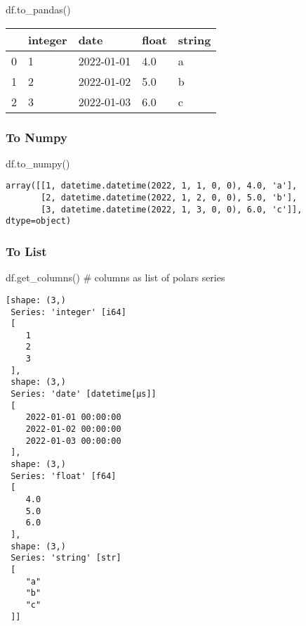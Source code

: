 \documentclass[
  letterpaper,
  DIV=11,
  numbers=noendperiod]{scrartcl}
\newenvironment{Shaded}{\begin{snugshade}}{\end{snugshade}}
\newcommand{\CommentTok}[1]{\textcolor[rgb]{0.37,0.37,0.37}{#1}}
\newcommand{\NormalTok}[1]{\textcolor[rgb]{0.00,0.23,0.31}{#1}}
\begin{document}
\begin{Shaded}
\begin{Highlighting}[]
\NormalTok{df.to\_pandas()}
\end{Highlighting}
\end{Shaded}

\begin{longtable}[]{@{}lllll@{}}
\toprule()
& integer & date & float & string \\
\midrule()
\endhead
0 & 1 & 2022-01-01 & 4.0 & a \\
1 & 2 & 2022-01-02 & 5.0 & b \\
2 & 3 & 2022-01-03 & 6.0 & c \\
\bottomrule()
\end{longtable}

\hypertarget{to-numpy}{%
\subsubsection{To Numpy}\label{to-numpy}}

\begin{Shaded}
\begin{Highlighting}[]
\NormalTok{df.to\_numpy()}
\end{Highlighting}
\end{Shaded}

\begin{verbatim}
array([[1, datetime.datetime(2022, 1, 1, 0, 0), 4.0, 'a'],
       [2, datetime.datetime(2022, 1, 2, 0, 0), 5.0, 'b'],
       [3, datetime.datetime(2022, 1, 3, 0, 0), 6.0, 'c']], dtype=object)
\end{verbatim}

\hypertarget{to-list}{%
\subsubsection{To List}\label{to-list}}

\begin{Shaded}
\begin{Highlighting}[]
\NormalTok{df.get\_columns() }\CommentTok{\# columns as list of polars series}
\end{Highlighting}
\end{Shaded}

\begin{verbatim}
[shape: (3,)
 Series: 'integer' [i64]
 [
    1
    2
    3
 ],
 shape: (3,)
 Series: 'date' [datetime[μs]]
 [
    2022-01-01 00:00:00
    2022-01-02 00:00:00
    2022-01-03 00:00:00
 ],
 shape: (3,)
 Series: 'float' [f64]
 [
    4.0
    5.0
    6.0
 ],
 shape: (3,)
 Series: 'string' [str]
 [
    "a"
    "b"
    "c"
 ]]
\end{verbatim}
\end{document}
